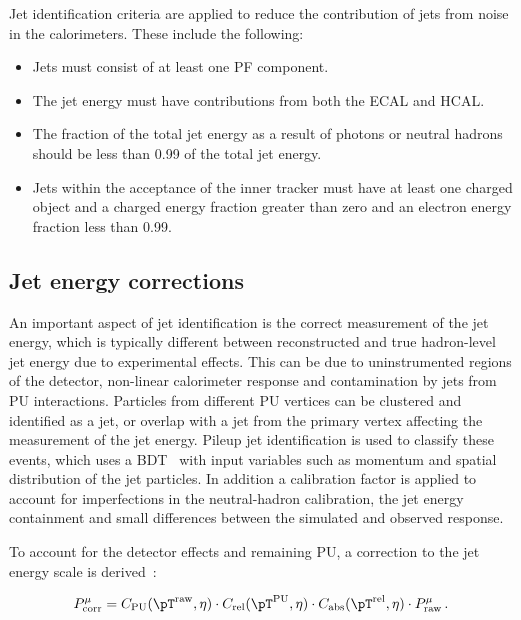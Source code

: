Jet identification criteria are applied to reduce the contribution of jets from
noise in the calorimeters. These include the following:
\begin{itemize}
\item Jets must consist of at least one \ac{PF} component. 
\item The jet energy must have contributions
from both the \ac{ECAL} and \ac{HCAL}.
\item The fraction of the total jet energy as a result of photons or neutral
hadrons should be less than 0.99 of the total jet energy.
\item Jets within the acceptance of the inner tracker must have at least one
charged object and a charged energy fraction greater than zero and an electron
energy fraction less than 0.99. 
\end{itemize}

\subsection{Jet energy corrections}
\label{sec:JEC}

An important aspect of jet identification is the correct measurement of the jet
energy, which is typically different between reconstructed and true hadron-level jet energy
due to experimental effects. This can be due to uninstrumented regions of the
detector, non-linear calorimeter response and contamination by jets from \ac{PU}
interactions. Particles from different \ac{PU} vertices can be clustered and identified as a
jet, or overlap with a jet from the primary vertex affecting the measurement of the jet energy.
Pileup jet identification \cite{CMS-PAS-JME-13-005} is used to classify these events, which uses a 
\ac{BDT}~\cite{TMVA} with input variables such as
momentum and spatial distribution of the jet particles. In addition
a calibration factor is applied to account for imperfections in the
neutral-hadron calibration, the jet energy containment and small differences
between the simulated and observed response.

To account for the detector effects and remaining \ac{PU}, a correction to the jet energy
scale is derived~\cite{CMS-JME-10-011}:


\begin{equation}
P_{\text{corr}}^{\mu} = C_{\text{PU}}(\pT^{\text{raw}},\eta) \cdot
C_{\text{rel}}(\pT^{\text{PU}},\eta) \cdot C_{\text{abs}}(\pT^{\text{rel}},\eta) \cdot
P_{\text{raw}}^{\mu}\, .
\end{equation}

